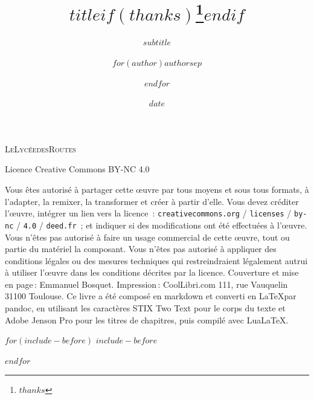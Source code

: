 \documentclass[10pt,a5paper]{book}
\title{$title$$if(thanks)$\thanks{$thanks$}$endif$}
\subtitle{$subtitle$}
\author{$for(author)$$author$$sep$ \and $endfor$}
\date{$date$}
\begin{document}
\newpage
\pagestyle{empty}
\mbox{} %

\cleardoublepage
\mbox{}
\begin{center}
\vspace{3cm}
\chapterfont\huge\textsc{Le\hspace{0.5em}Lycée\hspace{0.5em}des\hspace{0.5em}Routes}
\end{center}

\newpage

\vspace*{\fill}
\begin{center}
\begin{minipage}{0.7\textwidth}

\parfillskip=0pt

Licence Creative Commons BY-NC 4.0

\footnotesize
Vous êtes autorisé à partager cette œuvre par tous moyens et sous tous formats,
à l'adapter, la remixer, la transformer et créer à partir d'elle.
Vous devez créditer l'œuvre, intégrer un lien vers la licence~:
\texttt{\mbox{creativecommons.org}}
/ \texttt{\mbox{licenses}}
/ \texttt{\mbox{by-nc}}
/ \texttt{\mbox{4.0}}
/ \texttt{\mbox{deed.fr}}~;
et indiquer si des modifications ont été effectuées à l'œuvre.
Vous n'êtes pas autorisé à faire un usage commercial de cette œuvre, tout ou partie du matériel la composant.
Vous n'êtes pas autorisé à appliquer des conditions légales ou des mesures techniques
qui restreindraient légalement autrui à utiliser l'œuvre
dans les conditions décrites par la licence.
Couverture et mise en page\,: Emmanuel Bosquet.
Impression\,: CoolLibri.com 111, rue Vauquelin 31100 Toulouse.
Ce livre a été composé en markdown et converti en \LaTeX par pandoc,
en utilisant les caractères STIX Two Text pour le corps du texte
et Adobe Jenson Pro pour les titres de chapitres,
puis compilé avec Lua\LaTeX.

\end{minipage}
\end{center}
\vspace*{\fill}

\maketitle


$for(include-before)$
$include-before$

$endfor$
\end{document}
